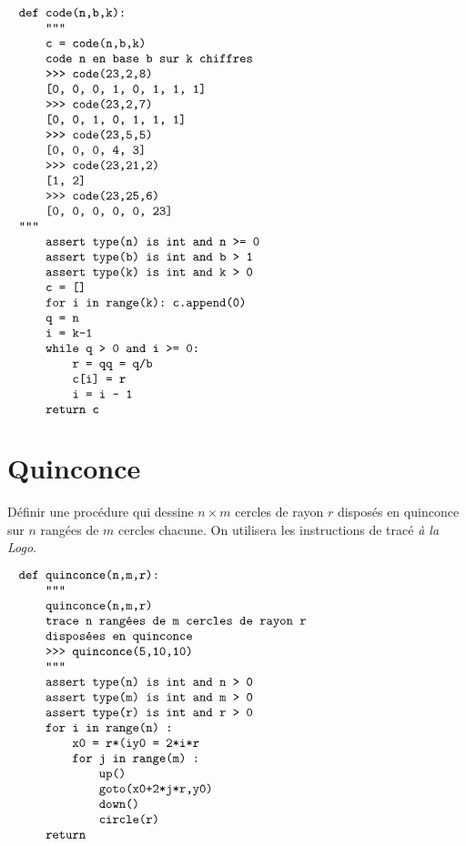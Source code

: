 \documentclass[12pt]{article}
\begin{document}
$$\begin{minipage}[t]{12cm}
\begin{verbatim}
def code(n,b,k):
    """
    c = code(n,b,k)
    code n en base b sur k chiffres
    >>> code(23,2,8)
    [0, 0, 0, 1, 0, 1, 1, 1]
    >>> code(23,2,7)
    [0, 0, 1, 0, 1, 1, 1]
    >>> code(23,5,5)
    [0, 0, 0, 4, 3]
    >>> code(23,21,2)
    [1, 2]
    >>> code(23,25,6)
    [0, 0, 0, 0, 0, 23]

    """
    assert type(n) is int and n >= 0
    assert type(b) is int and b > 1
    assert type(k) is int and k > 0
    c = []
    for i in range(k): c.append(0)
    q = n
    i = k-1
    while q > 0 and i >= 0:
        r = q%b
        q = q/b
        c[i] = r
        i = i - 1
    return c
\end{verbatim}
\end{minipage}$$

\section{Quinconce}
Définir une procédure qui dessine $n\times m$ cercles de rayon $r$
disposés en quinconce sur $n$ rangées de $m$ cercles chacune.
On utilisera les instructions de tracé {\em à la Logo}.

$$\begin{minipage}[t]{12cm}
\begin{verbatim}
def quinconce(n,m,r):
    """
    quinconce(n,m,r)
    trace n rangées de m cercles de rayon r
    disposées en quinconce
    >>> quinconce(5,10,10)
    """
    assert type(n) is int and n > 0
    assert type(m) is int and m > 0
    assert type(r) is int and r > 0
    for i in range(n) :
        x0 = r*(i%2)
        y0 = 2*i*r
        for j in range(m) :
            up()
            goto(x0+2*j*r,y0)
            down()
            circle(r)           
    return
\end{verbatim}
\end{minipage}$$

\end{document}
